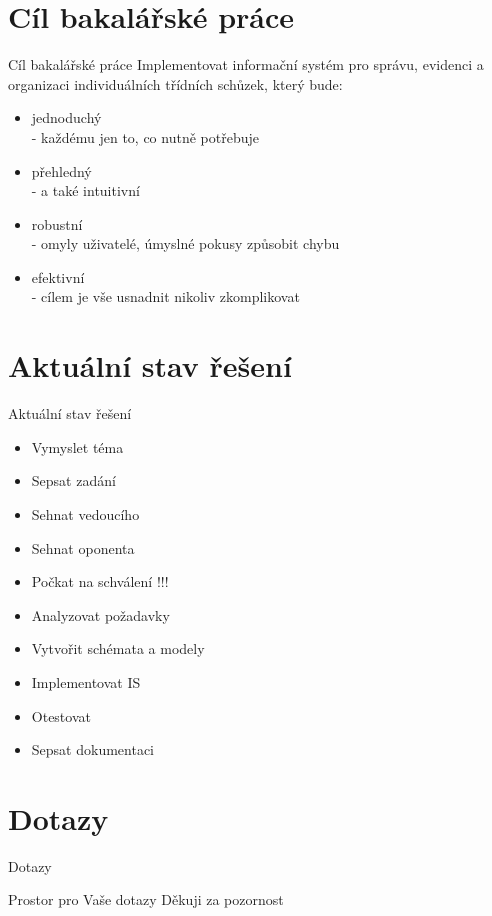 \documentclass{beamer}
\begin{document}
\section{Cíl bakalářské práce}
\begin{frame}{Cíl bakalářské práce}
Implementovat informační systém pro správu, evidenci a organizaci individuálních třídních schůzek, který bude:
\break
  \begin{itemize}
  \item jednoduchý \\ - každému jen to, co nutně potřebuje \break
  \item přehledný \\ - a také intuitivní \break
  \item robustní \\ - omyly uživatelé, úmyslné pokusy způsobit chybu \break
  \item efektivní \\ - cílem je vše usnadnit nikoliv zkomplikovat \break
  \end{itemize}
\end{frame}


\section{Aktuální stav řešení}
\begin{frame}{Aktuální stav řešení}
  \begin{itemize}
    \item Vymyslet téma \surd \\
    \item Sepsat zadání \surd \\
    \item Sehnat vedoucího \surd \\
    \item Sehnat oponenta \surd \\
    \item Počkat na schválení !!!
    \item Analyzovat požadavky \surd \\
    \item Vytvořit schémata a modely
    \item Implementovat IS
    \item Otestovat
    \item Sepsat dokumentaci
  \end{itemize}
\end{frame}


\section{Dotazy}
\begin{frame}{Dotazy}
  \begin{center}
    Prostor pro Vaše dotazy
    \break \break \break
    Děkuji za pozornost \\
  \end{center}
\end{frame}
\end{document}
